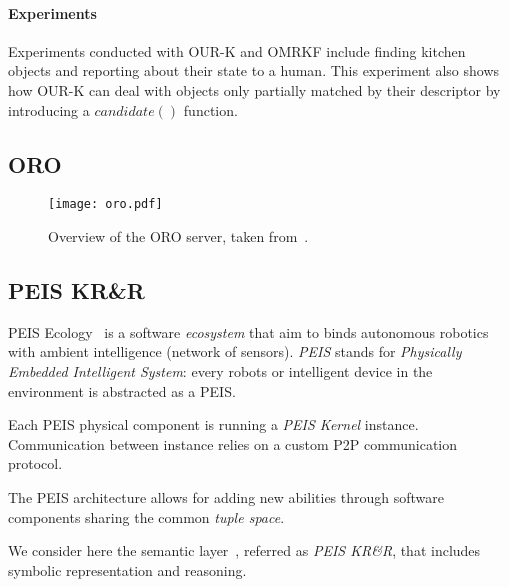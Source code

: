 \documentclass[journal]{IEEEtran}
\begin{document}
\paragraph{Experiments} Experiments conducted with OUR-K and OMRKF include
finding kitchen objects and reporting about their state to a human.  This
experiment also shows how OUR-K can deal with objects only partially matched by
their descriptor by introducing a $candidate()$ function.

\subsection{ORO}
\label{sect|oro}

\begin{figure}
    \centering
    \texttt{[image: oro.pdf]}

    \caption{Overview of the ORO server, taken from~\cite{Lemaignan2012}.}

    \label{fig|oro}
\end{figure}

\subsection{PEIS KR\&R}
\label{sect|peis-ecology}

{\sc PEIS Ecology}~\cite{Saffiotti2005} is a software \emph{ecosystem} that aim
to binds autonomous robotics with ambient intelligence (network of sensors).
\emph{PEIS} stands for \emph{Physically Embedded Intelligent System}: every
robots or intelligent device in the environment is abstracted as a PEIS.

Each PEIS physical component is running a \emph{PEIS Kernel} instance.
Communication between instance relies on a custom P2P communication protocol.

The PEIS architecture allows for adding new abilities through software
components sharing the common \emph{tuple space}.

We consider here the semantic layer~\cite{Daoutis2009}, referred as \emph{PEIS
KR\&R}, that includes symbolic representation and reasoning.

\end{document}
